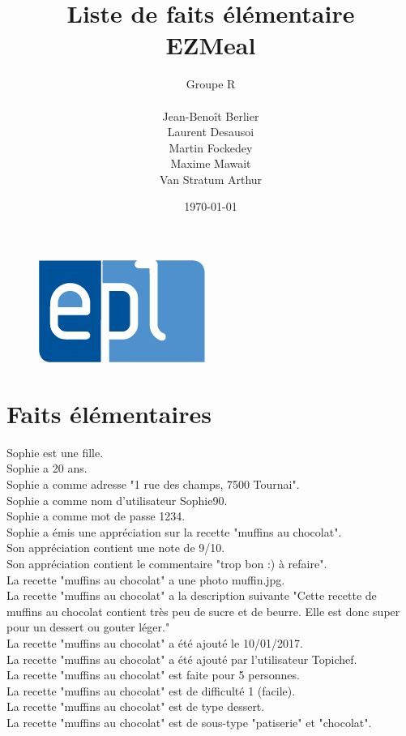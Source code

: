 \documentclass[a4paper,10pt]{article}
\title{Liste de faits élémentaire\\ EZMeal}
\author{Groupe R\\ \\Jean-Benoît Berlier\\Laurent Desausoi \\ Martin Fockedey \\Maxime Mawait \\Van Stratum Arthur
}
\date{\today}
\begin{document}
\begin{titlepage}
\begin{figure}[t]
\includegraphics[scale=0.3]{epl-logo.jpg}
\end{figure}

\maketitle 
\end{titlepage}
\section*{Faits élémentaires}
Sophie est une fille.\\
Sophie a 20 ans.\\
Sophie a comme adresse "1 rue des champs, 7500 Tournai".\\
Sophie a comme nom d'utilisateur Sophie90.\\
Sophie a comme mot de passe 1234.\\
Sophie a émis une appréciation sur la recette "muffins au chocolat".\\
Son appréciation contient une note de 9/10.\\
Son appréciation contient le commentaire "trop bon :) à refaire".\\
La recette "muffins au chocolat" a une photo muffin.jpg.\\
La recette "muffins au chocolat" a la description suivante "Cette recette de muffins au chocolat contient très peu de sucre et de beurre. Elle est donc super pour un dessert ou gouter léger."\\
La recette "muffins au chocolat" a été ajouté le 10/01/2017.\\
La recette "muffins au chocolat" a été ajouté par l'utilisateur Topichef.\\
La recette "muffins au chocolat" est faite pour 5 personnes.\\
La recette "muffins au chocolat" est de difficulté 1 (facile).\\
La recette "muffins au chocolat" est de type dessert.\\
La recette "muffins au chocolat" est de sous-type "patiserie" et "chocolat".\\
\end{document}
